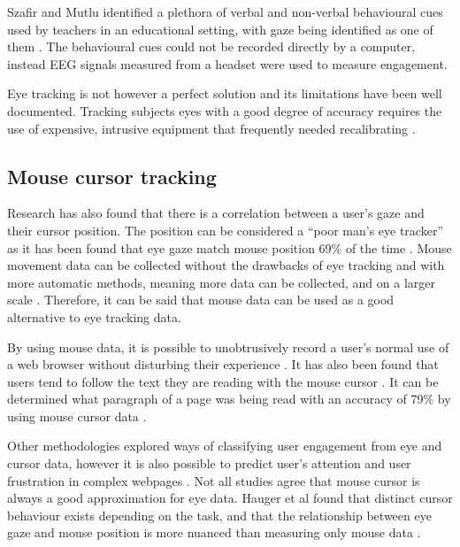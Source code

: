 \documentclass{article}
\begin{document}
Szafir and Mutlu identified a plethora of verbal and non-verbal behavioural cues used by teachers in an educational setting, with gaze being identified as one of them \cite{szafir2012pay}.
The behavioural cues could not be recorded directly by a computer, instead EEG signals measured from a headset were used to measure engagement.

Eye tracking is not however a perfect solution and its limitations have been well documented. 
Tracking subjects eyes with a good degree of accuracy requires the use of expensive, intrusive equipment that frequently needed recalibrating \cite{richardson2004eye}. 


\subsection{Mouse cursor tracking}

Research has also found that there is a correlation between a user’s gaze and their cursor position. 
The position can be considered a ``poor man’s eye tracker'' as it has been found that eye gaze match mouse position 69\% of the time \cite{cooke2006mouse}. 
Mouse movement data can be collected without the drawbacks of eye tracking and with more automatic methods, meaning more data can be collected, and on a larger scale \cite{demvsar2017quantifying}.
Therefore, it can be said that mouse data can be used as a good alternative to eye tracking data.

By using mouse data, it is possible to unobtrusively record a user’s normal use of a web browser without disturbing their experience \cite{goecks2000learning}.
It has also been found that users tend to follow the text they are reading with the mouse cursor \cite{liu2007detecting}. 
It can be determined what paragraph of a page was being read with an accuracy of 79\% by using mouse cursor data \cite{hauger2011using}. 

Other methodologies explored ways of classifying user engagement from eye and cursor data, however it is also possible to predict user's attention and user frustration in complex webpages \cite{navalpakkam2012mouse}.
Not all studies agree that mouse cursor is always a good approximation for eye data. 
Hauger et al found that distinct cursor behaviour exists depending on the task, and that the relationship between eye gaze and mouse position is more nuanced than measuring only mouse data \cite{huang2012user}.
\end{document}
